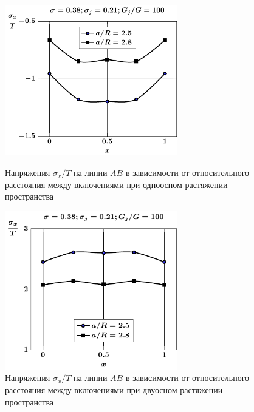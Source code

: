\begin{russian}
\begin{figure}[h!]
\centering\footnotesize
\parbox[b]{7.5cm}{\centering\includegraphics[width=7.5cm]{inc13-a-d95-g100-t1-sig_x-ab.pdf}
\caption{Напряжения $\sigma_x/T$ на линии  $AB$ в зависимости от относительного расстояния между включениями при одноосном растяжении пространства
\label{f:8:72}}}\hfil\hfil
\parbox[b]{7.5cm}{\centering\includegraphics[width=7.5cm]{inc13-a-d95-g100-t2-sig_x-ab.pdf}
\caption{Напряжения $\sigma_x/T$ на линии  $AB$ в зависимости от относительного расстояния между включениями при двуосном растяжении пространства
\label{f:8:73}}}
\end{figure}


\end{russian}
